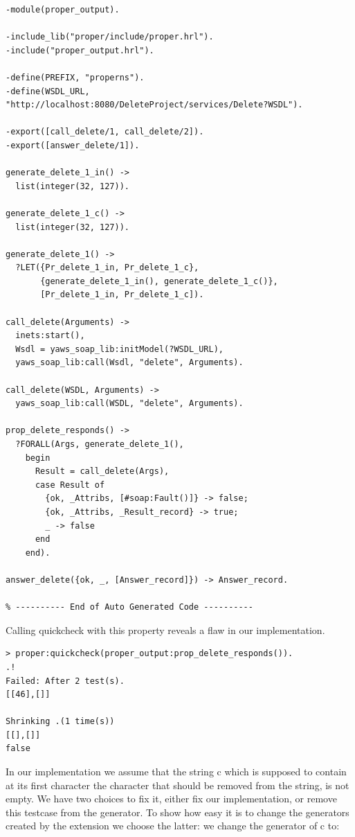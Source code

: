 \documentclass[submission,copyright,a4]{eptcs}
\begin{document}
\begin{lstlisting}
-module(proper_output).

-include_lib("proper/include/proper.hrl").
-include("proper_output.hrl").

-define(PREFIX, "properns").
-define(WSDL_URL, "http://localhost:8080/DeleteProject/services/Delete?WSDL").

-export([call_delete/1, call_delete/2]).
-export([answer_delete/1]).

generate_delete_1_in() -> 
  list(integer(32, 127)).

generate_delete_1_c() -> 
  list(integer(32, 127)).

generate_delete_1() -> 
  ?LET({Pr_delete_1_in, Pr_delete_1_c},
       {generate_delete_1_in(), generate_delete_1_c()},
       [Pr_delete_1_in, Pr_delete_1_c]).

call_delete(Arguments) ->
  inets:start(),
  Wsdl = yaws_soap_lib:initModel(?WSDL_URL),
  yaws_soap_lib:call(Wsdl, "delete", Arguments).
    
call_delete(WSDL, Arguments) ->
  yaws_soap_lib:call(WSDL, "delete", Arguments).

prop_delete_responds() ->
  ?FORALL(Args, generate_delete_1(),
    begin
      Result = call_delete(Args),
      case Result of 
        {ok, _Attribs, [#soap:Fault()]} -> false; 
        {ok, _Attribs, _Result_record} -> true;
        _ -> false
      end
    end).

answer_delete({ok, _, [Answer_record]}) -> Answer_record.

% ---------- End of Auto Generated Code ---------- 
\end{lstlisting}

Calling quickcheck with this property reveals a flaw in our implementation.
\begin{lstlisting}
> proper:quickcheck(proper_output:prop_delete_responds()). 
.!
Failed: After 2 test(s).
[[46],[]]

Shrinking .(1 time(s))
[[],[]]
false
\end{lstlisting}

In our implementation we assume that the string c which is supposed to contain at its first character the character that should be removed from the string, is not empty. We have two choices to fix it, either fix our implementation, or remove this testcase from the generator. To show how easy it is to change the generators created by the extension we choose the latter: we change the generator of c to:
\end{document}
